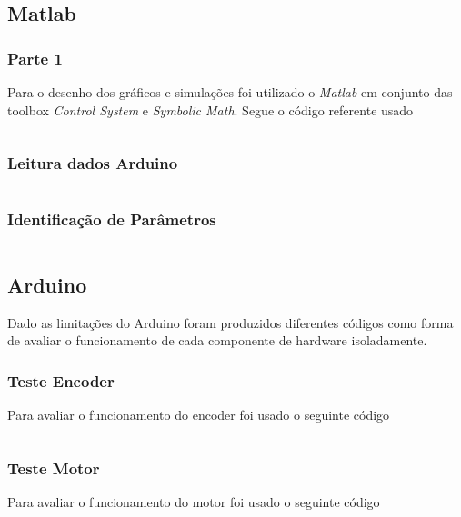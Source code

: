 \documentclass[a4paper,11pt]{article}
\begin{document}
\subsection*{Matlab}

\subsubsection*{Parte 1}
Para o desenho dos gráficos e simulações foi utilizado o \textit{Matlab} em conjunto das toolbox \textit{Control System}\cite{matlabcontrol} e \textit{Symbolic Math}\cite{matlabsymbolic}. Segue o código referente usado

\inputminted[xleftmargin=15pt,linenos,frame=single,framesep=5pt,breaklines=true]{matlab}{../matlab/project.m}

\newpage
\subsubsection*{Leitura dados Arduino}
\inputminted[xleftmargin=15pt,linenos,frame=single,framesep=5pt,breaklines=true]{matlab}{../matlab/plotArduino.m}

\newpage
\subsubsection*{Identificação de Parâmetros}
\inputminted[xleftmargin=15pt,linenos,frame=single,framesep=5pt,breaklines=true]{matlab}{../matlab/identification.m}

\newpage
\subsection*{Arduino}
Dado as limitações do Arduino foram produzidos diferentes códigos como forma de avaliar o funcionamento de cada componente de hardware isoladamente.

\subsubsection*{Teste Encoder}
Para avaliar o funcionamento do encoder foi usado o seguinte código
\inputminted[xleftmargin=15pt,linenos,frame=single,framesep=5pt,breaklines=true]{c++}{../arduino/test_enconder/test_enconder.ino}

\newpage
\subsubsection*{Teste Motor}
Para avaliar o funcionamento do motor foi usado o seguinte código
\inputminted[xleftmargin=15pt,linenos,frame=single,framesep=5pt,breaklines=true]{c++}{../arduino/test_dcmotor/test_dcmotor.ino}
\end{document}

